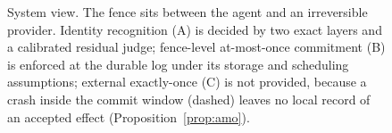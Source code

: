 \begin{figure}[!tbp]
\caption{System view. The fence sits between the agent and an irreversible provider. Identity recognition (A) is decided by two exact layers and a calibrated residual judge; fence-level at-most-once commitment (B) is enforced at the durable log under its storage and scheduling assumptions; external exactly-once (C) is not provided, because a crash inside the commit window (dashed) leaves no local record of an accepted effect (Proposition~\ref{prop:amo}).}\label{fig:architecture}
\end{figure}
